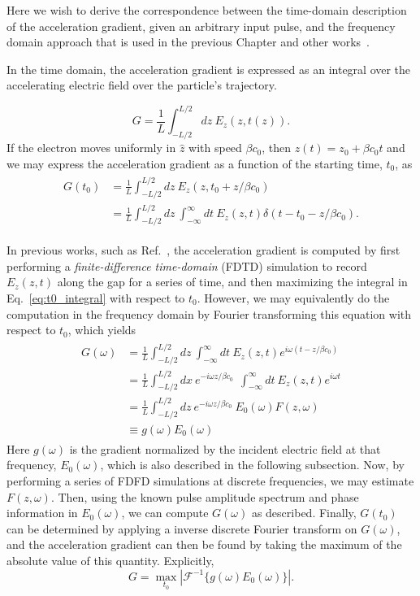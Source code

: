 Here we wish to derive the correspondence between the time-domain description of the acceleration gradient, given an arbitrary input pulse, and the frequency domain approach that is used in the previous Chapter and other works~\cite{hughes_method_2017, plettner2006proposed}. 

In the time domain, the acceleration gradient is expressed as an integral over the accelerating electric field over the particle's trajectory.

\begin{equation}
G = \frac{1}{L}\int_{-L/2}^{L/2}dz\ E_z(z, t(z)).
\end{equation}
%
If the electron moves uniformly in $\hat{z}$ with speed $\beta c_0$, then $z(t) = z_0 + \beta c_0 t$ and we may express the acceleration gradient as a function of the starting time, $t_0$, as
\begin{align}
\begin{split}
G(t_0) &= \frac{1}{L}\int_{-L/2}^{L/2} dz\ E_z(z,t_0 + z/\beta c_0) \\
 &= \frac{1}{L}\int_{-L/2}^{L/2} dz\ \int_{-\infty}^{\infty}dt\ E_z(z,t)\delta(t-t_0- z/\beta c_0).
 \label{eq:t0_integral}
 \end{split}
\end{align}

In previous works, such as Ref.~, the acceleration gradient is computed by first performing a \textit{finite-difference time-domain} (FDTD) simulation to record $E_z(z,t)$ along the gap for a series of time, and then maximizing the integral in Eq.~\ref{eq:t0_integral} with respect to $t_0$. However, we may equivalently do the computation in the frequency domain by Fourier transforming this equation with respect to $t_0$, which yields
\begin{align}
\begin{split}
    G(\omega) &= \frac{1}{L}\int_{-L/2}^{L/2} dz\ \int_{-\infty}^{\infty}dt\ E_z(z,t) e^{i\omega (t - z/\beta c_0)} \\
  &= \frac{1}{L}\int_{-L/2}^{L/2} dx\ e^{-i\omega z/\beta c_0} \ \ \int_{-\infty}^{\infty}dt\ E_z(z,t) e^{i\omega t} \\
  &= \frac{1}{L}\int_{-L/2}^{L/2} dz\ e^{-i\omega z/\beta c_0}\ E_0(\omega) F(z,\omega)\\
  &\equiv g(\omega)E_0(\omega)
  \end{split}
\end{align}
Here $g(\omega)$ is the gradient normalized by the incident electric field at that frequency, $E_0(\omega)$, which is also described in the following subsection. 
Now, by performing a series of FDFD simulations at discrete frequencies, we may estimate $F(z,\omega)$. Then, using the known pulse amplitude spectrum and phase information in $E_0(\omega)$, we can compute $G(\omega)$ as described. Finally, $G(t_0)$ can be determined by applying a inverse discrete Fourier transform on $G(\omega)$, and the acceleration gradient can then be found by taking the maximum of the absolute value of this quantity. Explicitly,
\begin{equation}
    G = \max_{t_0}|\mathcal{F}^{-1}\{ g(\omega) E_0(\omega)\}|.
\end{equation}

